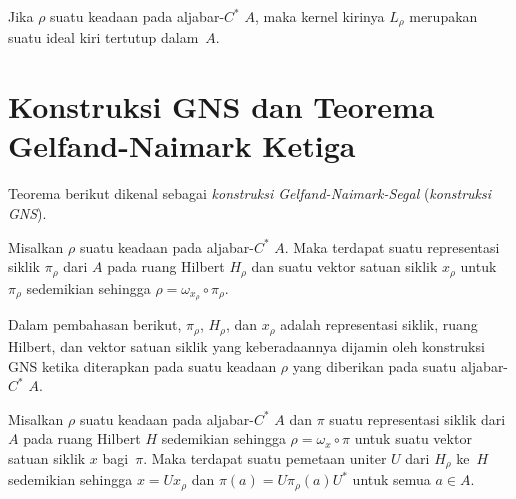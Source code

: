\begin{prop} Jika $\rho$ suatu keadaan pada aljabar-$C^*$ $A$, maka kernel kirinya $L_\rho$ merupakan suatu
ideal kiri tertutup dalam~$A$.
\end{prop}


























\section{Konstruksi GNS dan Teorema Gelfand-Naimark Ketiga}
Teorema berikut dikenal sebagai
\emph{konstruksi Gelfand-Naimark-Segal} (\emph{konstruksi GNS}).

\begin{thm}\label{0029} Misalkan $\rho$ suatu keadaan pada aljabar-$C^*$ $A$. Maka
terdapat suatu representasi siklik $\pi_\rho$ dari $A$ pada ruang Hilbert $H_\rho$ dan suatu
vektor satuan siklik $x_\rho$ untuk $\pi_\rho$ sedemikian sehingga $\rho = \omega_{x_\rho} \circ
\pi_\rho$.
\end{thm}

\begin{notn} Dalam pembahasan berikut, $\pi_\rho$, $H_\rho$, dan $x_\rho$ adalah representasi
siklik, ruang Hilbert, dan vektor satuan siklik yang keberadaannya dijamin oleh konstruksi
GNS ketika diterapkan pada suatu keadaan $\rho$ yang diberikan pada suatu aljabar-$C^*$ $A$.
\end{notn}

\begin{prop} Misalkan $\rho$ suatu keadaan pada aljabar-$C^*$ $A$ dan $\pi$ suatu representasi siklik
dari $A$ pada ruang Hilbert $H$ sedemikian sehingga $\rho = \omega_x \circ \pi$ untuk suatu vektor
satuan siklik $x$ bagi~$\pi$. Maka terdapat suatu pemetaan uniter $U$ dari $H_\rho$ ke~$H$ sedemikian sehingga
$x = Ux_\rho$ dan $\pi(a) = U \pi_\rho(a) U^*$ untuk semua $a \in A$.
\end{prop}


